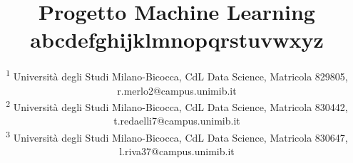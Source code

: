 
\title{Progetto Machine Learning \\ abcdefghijklmnopqrstuvwxyz}

\author{
	\newline\newline
	\textsuperscript{1} Università degli Studi Milano-Bicocca, CdL Data Science, Matricola 829805, r.merlo2@campus.unimib.it\\
	\textsuperscript{2} Università degli Studi Milano-Bicocca, CdL Data Science, Matricola 830442, t.redaelli7@campus.unimib.it\\
	\textsuperscript{3} Università degli Studi Milano-Bicocca, CdL Data Science, Matricola 830647, l.riva37@campus.unimib.it
}

